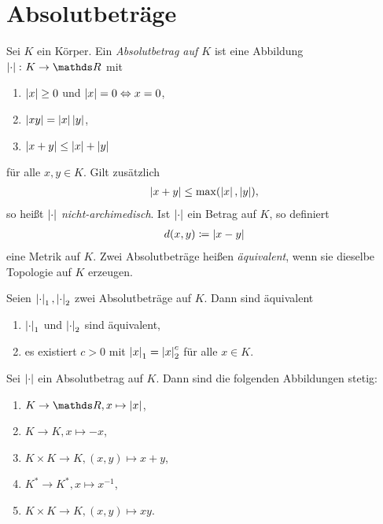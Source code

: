 \chapter{Absolutbeträge}
\begin{defi}
Sei $K$ ein Körper. Ein \emph{Absolutbetrag auf $K$} ist eine Abbildung $\abs{\cdot}\colon K \to \R$ mit
\begin{enumerate}[label=\roman*)]
\item $\left\vert x\right\vert\geq 0$ und $\left\vert x\right\vert=0 \Leftrightarrow x=0$,
\item $\left\vert xy\right\vert=\left\vert x\right\vert\left\vert y\right\vert$,
\item $\left\vert x+y\right\vert\leq \left\vert x\right\vert+\left\vert y\right\vert$
\end{enumerate}
für alle $x,y\in K$.
Gilt zusätzlich 
\begin{align*}
\left\vert x+y\right\vert\leq \max(\left\vert x\right\vert,\left\vert y\right\vert),
\end{align*}
so heißt $\left\vert\cdot\right\vert$ \emph{nicht-archimedisch}.
Ist $\left\vert\cdot\right\vert$ ein Betrag auf $K$, so definiert
\begin{align*}
d(x,y)\coloneqq \left\vert x-y\right\vert
\end{align*}
eine Metrik auf $K$.
Zwei Absolutbeträge heißen \emph{äquivalent}, wenn sie dieselbe Topologie auf $K$ erzeugen.
\end{defi}

\begin{satz}
Seien $\left\vert\cdot\right\vert_1,\left\vert\cdot\right\vert_2$ zwei Absolutbeträge auf $K$.
Dann sind äquivalent
\begin{enumerate}[label=\roman*)]
\item $\left\vert\cdot\right\vert_1$ und $\left\vert\cdot\right\vert_2$ sind äquivalent,
\item es existiert $c>0$ mit $\left\vert x\right\vert_1=\left\vert x\right\vert_2^c$ für alle $x\in K$.
\end{enumerate}
\end{satz}

\begin{satz}
Sei $\left\vert\cdot\right\vert$ ein Absolutbetrag auf $K$. Dann sind die folgenden Abbildungen stetig:
\begin{enumerate}[label=\roman*)]
\item $K\to \R, x \mapsto \abs{x}$,
\item $K\to K, x\mapsto -x$,
\item $K \times K \to K, (x,y)\mapsto x+y$,
\item $K^\ast \to K^\ast, x \mapsto x^{-1}$,
\item $K \times K \to K, (x,y)\mapsto xy$.
\end{enumerate}
\end{satz}

